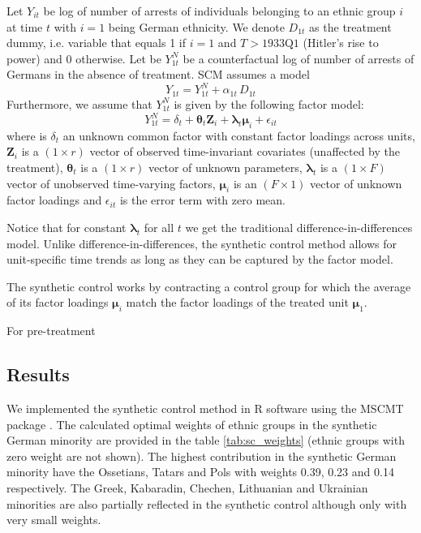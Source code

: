 Let $Y_{it}$ be log of number of arrests of individuals belonging to an ethnic group $i$ at time $t$ with $i = 1$ being German ethnicity.  We
denote $D_{1t}$ as the treatment dummy, i.e. variable that equals 1 if $i = 1$ and $T > \text{1933Q1}$ (Hitler's rise to power) and 0 otherwise. 
Let be $Y_{1t}^N$ be a counterfactual log of number of arrests of Germans in the absence of treatment. SCM assumes a model
\begin{equation}
    Y_{1t} = Y_{1t}^N + \alpha_{1t} \, D_{1t}
\end{equation}
Furthermore, we assume that $Y_{1t}^N$ is given by the following factor model:
\begin{equation}
   Y_{1t}^N = \delta_t + \boldsymbol{\theta}_t \boldsymbol{Z}_i +
   \boldsymbol{\lambda}_t \boldsymbol{\mu}_i + \epsilon_{it}
\end{equation}
where is $\delta_t$ an unknown common factor with constant factor
loadings across units, $\boldsymbol{Z}_i$ is a
$(1 \times r)$ vector of observed time-invariant covariates (unaffected by the treatment),  $\boldsymbol{\theta}_t$ is a $(1 \times r)$ vector of
unknown parameters, $\boldsymbol{\lambda}_t$ is a $(1 \times F)$ vector of unobserved time-varying factors, $\boldsymbol{\mu}_i$ is an $(F \times 1)$ vector of unknown factor loadings
and $\epsilon_{it}$ is the error term with zero mean. 

Notice that for constant  $\boldsymbol{\lambda}_t$ for all $t$ we get the traditional  difference-in-differences model. Unlike difference-in-differences,  the synthetic control method  allows for unit-specific time trends as long as they can be captured by the factor model. 

The synthetic control works by contracting a control group for which the average of its factor loadings $\boldsymbol{\mu}_i$ match the factor loadings of the treated unit  $\boldsymbol{\mu}_1$.

For pre-treatment

\subsection{Results}
We implemented the synthetic control method in R software using the MSCMT package \citep{becker_fast_2018}. The calculated optimal weights of ethnic groups in the synthetic German minority are provided in the table \ref{tab:sc_weights} (ethnic groups with zero weight are not shown). The highest contribution in the synthetic German minority have the Ossetians, Tatars and Pols with weights 0.39, 0.23 and 0.14 respectively. The Greek, Kabaradin, Chechen, Lithuanian and Ukrainian minorities are also partially reflected in the synthetic control although only with very small weights. 



